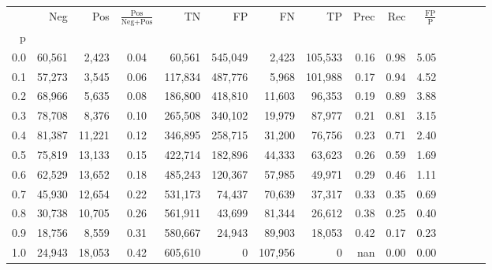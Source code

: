 \begin{tabular}{rrrcrrrrrrrrrrr}
\toprule
{} &     Neg &     Pos & $\frac{\text{Pos}}{\text{Neg}+\text{Pos}}$ &       TN &       FP &       FN &       TP &  Prec &   Rec & $\frac{\text{FP}}{\text{P}}$ \\
p   &         &         &                                            &          &          &          &          &       &       &                              \\
\midrule
0.0 &  60,561 &   2,423 &                                       0.04 &   60,561 &  545,049 &    2,423 &  105,533 &  0.16 &  0.98 &                         5.05 \\
0.1 &  57,273 &   3,545 &                                       0.06 &  117,834 &  487,776 &    5,968 &  101,988 &  0.17 &  0.94 &                         4.52 \\
0.2 &  68,966 &   5,635 &                                       0.08 &  186,800 &  418,810 &   11,603 &   96,353 &  0.19 &  0.89 &                         3.88 \\
0.3 &  78,708 &   8,376 &                                       0.10 &  265,508 &  340,102 &   19,979 &   87,977 &  0.21 &  0.81 &                         3.15 \\
0.4 &  81,387 &  11,221 &                                       0.12 &  346,895 &  258,715 &   31,200 &   76,756 &  0.23 &  0.71 &                         2.40 \\
0.5 &  75,819 &  13,133 &                                       0.15 &  422,714 &  182,896 &   44,333 &   63,623 &  0.26 &  0.59 &                         1.69 \\
0.6 &  62,529 &  13,652 &                                       0.18 &  485,243 &  120,367 &   57,985 &   49,971 &  0.29 &  0.46 &                         1.11 \\
0.7 &  45,930 &  12,654 &                                       0.22 &  531,173 &   74,437 &   70,639 &   37,317 &  0.33 &  0.35 &                         0.69 \\
0.8 &  30,738 &  10,705 &                                       0.26 &  561,911 &   43,699 &   81,344 &   26,612 &  0.38 &  0.25 &                         0.40 \\
0.9 &  18,756 &   8,559 &                                       0.31 &  580,667 &   24,943 &   89,903 &   18,053 &  0.42 &  0.17 &                         0.23 \\
1.0 &  24,943 &  18,053 &                                       0.42 &  605,610 &        0 &  107,956 &        0 &   nan &  0.00 &                         0.00 \\
\bottomrule
\end{tabular}
